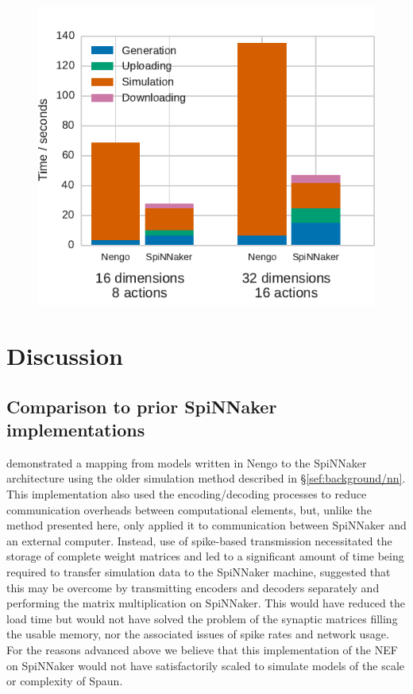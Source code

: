 \documentclass[conference]{IEEEtran}
\begin{document}
  \begin{figure}[!t]
    \includegraphics{figures/spa_wall_clock}
    \caption{}
    \label{fig:results/spa-wall-clock}
  \end{figure}
  \section{Discussion}

  \subsection{Comparison to prior SpiNNaker implementations}

  \textcite{Galluppi2012} demonstrated a mapping from models written in Nengo to the SpiNNaker architecture using the older simulation method described in \S\ref{sef:background/nn}.
  This implementation also used the encoding/decoding processes to reduce communication overheads between computational elements, but, unlike the method presented here, only applied it to communication between SpiNNaker and an external computer.
  Instead, use of spike-based transmission necessitated the storage of complete weight matrices and led to a significant amount of time being required to transfer simulation data to the SpiNNaker machine, \citeauthor{Galluppi2012} suggested that this may be overcome by transmitting encoders and decoders separately and performing the matrix multiplication on SpiNNaker.
  This would have reduced the load time but would not have solved the problem of the synaptic matrices filling the usable memory, nor the associated issues of spike rates and network usage.
  For the reasons advanced above we believe that this implementation of the NEF on SpiNNaker would not have satisfactorily scaled to simulate models of the scale or complexity of Spaun.
\end{document}
